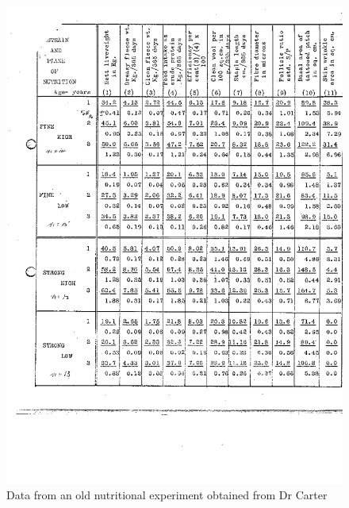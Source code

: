 %

\begin{figure}[h]
  \centering
   \includegraphics[width=1.1\textwidth]{carterup1a.png}
  \caption{Data from an old nutritional experiment obtained from Dr Carter}
  \label{fig:carterup1a}
\end{figure}

%

